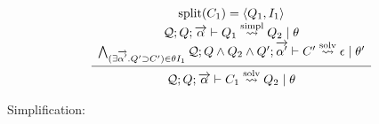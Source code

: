 \begin{gather*}
  \infer{\mathcal{Q}; Q; \overrightarrow{\alpha} \vdash C_1 \overset{\mathrm{solv}}{\elab} Q_2 \mid \theta}{
    \begin{array}{c}
      \mathrm{split}(C_1) = \langle Q_1, I_1\rangle \\
      \mathcal{Q}; Q; \overrightarrow{\alpha} \vdash Q_1 \overset{\mathrm{simpl}}{\elab} Q_2 \mid \theta \\
      \bigwedge_{(\exists \overrightarrow{\alpha'}\ldotp Q' \supset C') \in \theta I_1} \mathcal{Q}; Q \land Q_2 \land Q'; \overrightarrow{\alpha'} \vdash C' \overset{\mathrm{solv}}{\elab} \epsilon \mid \theta'
    \end{array}
  }
\end{gather*}

Simplification:

